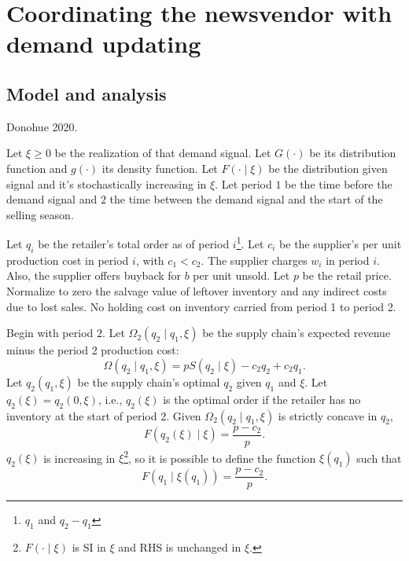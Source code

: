\newpage
\section{Coordinating the newsvendor with demand updating}

\subsection{Model and analysis}
\begin{note}
    Donohue 2020.
\end{note}
Let $\xi\geq 0$ be the realization of that demand signal. Let $G(\cdot)$ be its distribution function and $g(\cdot)$ its density function. Let $F(\cdot\mid\xi)$ be the distribution given signal and it's stochastically increasing in $\xi$. Let period $1$ be the time before the demand signal and $2$ the time between the demand signal and the start of the selling season. 

Let $q_i$ be the retailer's total order as of period $i$\footnote{$q_1$ and $q_2-q_1$}. Let $c_i$ be the supplier's per unit production cost in period $i$, with $c_1<c_2$. The supplier charges $w_i$ in period $i$. Also, the supplier offers buyback for $b$ per unit unsold. Let $p$ be the retail price. Normalize to zero the salvage value of leftover inventory and any indirect costs due to lost sales. No holding cost on inventory carried from period 1 to period 2.

Begin with period $2$. Let $\Omega_2(q_2\mid q_1,\xi)$ be the supply chain's expected revenue minus the period 2 production cost:
\begin{equation}
    \Omega(q_2\mid q_1,\xi)=p S(q_2\mid \xi)-c_2 q_2+c_2 q_1.
\end{equation}
Let $q_2(q_1,\xi)$ be the supply chain's optimal $q_2$ given $q_1$ and $\xi$. Let $q_2(\xi)=q_2(0,\xi)$, i.e., $q_2(\xi)$ is the optimal order if the retailer has no inventory at the start of period 2. Given $\Omega_2(q_2\mid q_1,\xi)$ is strictly concave in $q_2$,
\begin{equation}
    F(q_2(\xi)\mid\xi)=\frac{p-c_2}{p}.
\end{equation}
$q_2(\xi)$ is increasing in $\xi$\footnote{$F(\cdot\mid \xi)$ is SI in $\xi$ and RHS is unchanged in $\xi$.}, so it is possible to define the function $\xi(q_1)$ such that 
\begin{equation}
    F(q_1\mid\xi(q_1))=\frac{p-c_2}{p}.
\end{equation}

